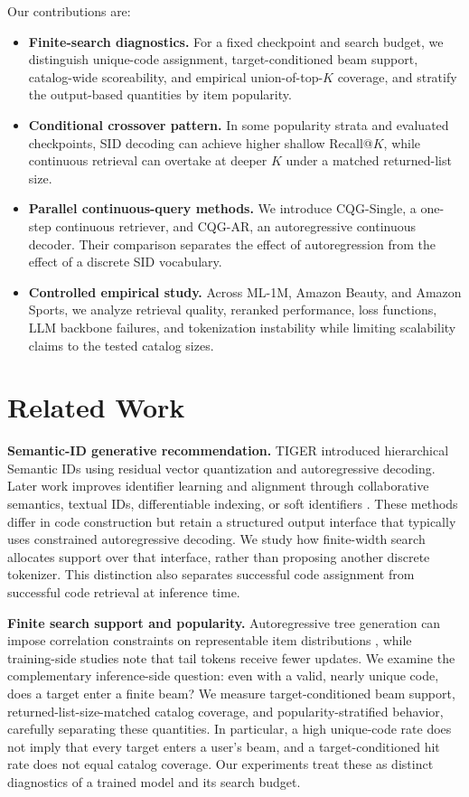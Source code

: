 \documentclass[letterpaper]{article}
\begin{document}
Our contributions are:
\begin{itemize}
    \item \textbf{Finite-search diagnostics.} For a fixed checkpoint and search
    budget, we distinguish unique-code assignment, target-conditioned beam
    support, catalog-wide scoreability, and empirical union-of-top-$K$
    coverage, and stratify the output-based quantities by item popularity.
    \item \textbf{Conditional crossover pattern.} In some popularity strata
    and evaluated checkpoints, SID decoding can achieve higher shallow
    Recall@$K$, while continuous retrieval can overtake at deeper $K$ under a
    matched returned-list size.
    \item \textbf{Parallel continuous-query methods.} We introduce CQG-Single, a one-step continuous retriever, and CQG-AR, an autoregressive continuous decoder. Their comparison separates the effect of autoregression from the effect of a discrete SID vocabulary.
    \item \textbf{Controlled empirical study.} Across ML-1M, Amazon Beauty, and Amazon Sports, we analyze retrieval quality, reranked performance, loss functions, LLM backbone failures, and tokenization instability while limiting scalability claims to the tested catalog sizes.
\end{itemize}

\section{Related Work}

\textbf{Semantic-ID generative recommendation.}
TIGER \citep{rajput2023tiger} introduced hierarchical Semantic IDs using
residual vector quantization and autoregressive decoding. Later work improves
identifier learning and alignment through collaborative semantics, textual
IDs, differentiable indexing, or soft identifiers
\citep{zheng2024letter,wang2024eager,tan2024idgenrec,fu2026diger,li2026unigrec}.
These methods differ in code construction but retain a structured output
interface that typically uses constrained autoregressive decoding. We study
how finite-width search allocates support over that interface, rather than
proposing another discrete tokenizer. This distinction also separates
successful code assignment from successful code retrieval at inference time.

\textbf{Finite search support and popularity.}
Autoregressive tree generation can impose correlation constraints on
representable item distributions \citep{hou2026expressiveness}, while
training-side studies note that tail tokens receive fewer updates. We examine
the complementary inference-side question: even with a valid, nearly unique
code, does a target enter a finite beam? We measure target-conditioned beam
support, returned-list-size-matched catalog coverage, and popularity-stratified behavior,
carefully separating these quantities. In particular, a high unique-code rate
does not imply that every target enters a user's beam, and a target-conditioned
hit rate does not equal catalog coverage. Our experiments treat these as
distinct diagnostics of a trained model and its search budget.
\end{document}
